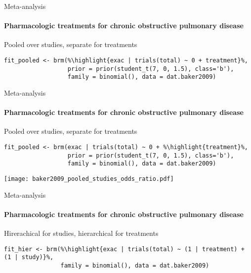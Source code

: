 \documentclass[finnish,english,t]{beamer}
\newcommand{\reducedstrut}{\vrule width 0pt height .9\ht\strutbox depth .9\dp\strutbox\relax}
\newcommand{\highlight}[1]{%
  \begingroup
  \setlength{\fboxsep}{0pt}%
  \colorbox{yellow!30}{\reducedstrut\detokenize{#1}\/}%
  \endgroup
}
\begin{document}
\begin{frame}[fragile]{Meta-analysis}
\framesubtitle{Pharmacologic treatments for chronic obstructive pulmonary disease}

\vspace{-0.75\baselineskip}
Pooled over studies, separate for treatments

\vspace{-0.25\baselineskip}
\begin{verbatim}
fit_pooled <- brm(%\highlight{exac | trials(total) ~ 0 + treatment}%,
                  prior = prior(student_t(7, 0, 1.5), class='b'),
                  family = binomial(), data = dat.baker2009)
\end{verbatim}
\vspace{-0.25\baselineskip}

\end{frame}

\begin{frame}[fragile]{Meta-analysis}
\framesubtitle{Pharmacologic treatments for chronic obstructive pulmonary disease}

\vspace{-0.75\baselineskip}
Pooled over studies, separate for treatments

\vspace{-0.25\baselineskip}
\begin{verbatim}
fit_pooled <- brm(exac | trials(total) ~ 0 + %\highlight{treatment}%,
                  prior = prior(student_t(7, 0, 1.5), class='b'),
                  family = binomial(), data = dat.baker2009)
\end{verbatim}
\vspace{-0.25\baselineskip}
  {\texttt{[image: baker2009\_pooled\_studies\_odds\_ratio.pdf]}}

\end{frame}

\begin{frame}[fragile]{Meta-analysis}
\framesubtitle{Pharmacologic treatments for chronic obstructive pulmonary disease}

\vspace{-0.75\baselineskip}
Hirerachical for studies, hierarchical for treatments

\vspace{-0.25\baselineskip}
\begin{verbatim}
fit_hier <- brm(%\highlight{exac | trials(total) ~ (1 | treatment) + (1 | study)}%,
                family = binomial(), data = dat.baker2009)
\end{verbatim}

\end{frame}
\end{document}

